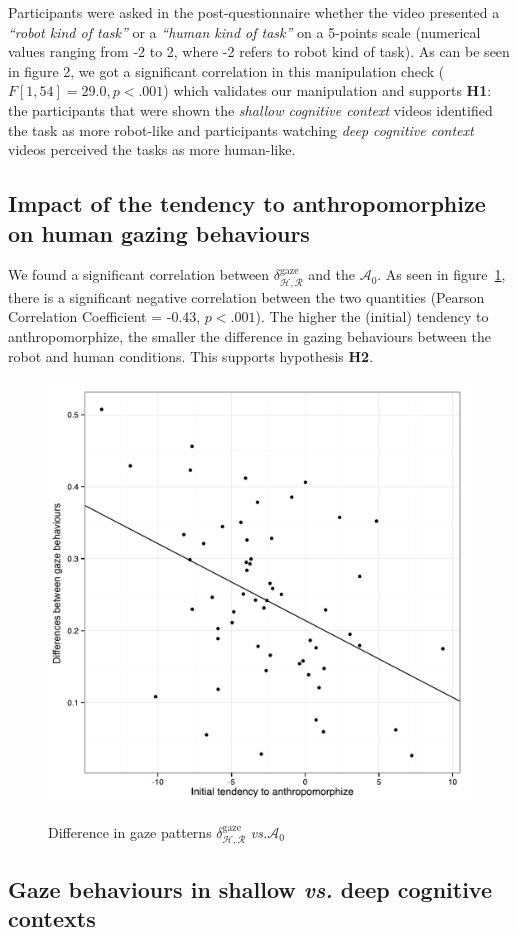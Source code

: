 \documentclass[lettersize, noapacite, twoside, HRI]{apa_HRI}
\newcommand{\vs}{\textit{vs.}\xspace}
\newcommand{\h}[1]{\textbf{H#1}\xspace}
\newcommand{\anti}{{$\mathcal{A}_0$\xspace}}
\begin{document}
Participants were asked in the post-questionnaire whether the video presented a
\emph{``robot kind of task''} or a \emph{``human kind of task''} on a 5-points
scale (numerical values ranging from -2 to 2, where -2 refers to robot kind of
task). As can be seen in figure 2, we got a significant correlation in this
manipulation check ($F[1,54] = 29.0, p < .001$) which validates our manipulation
and supports \h{1}: the participants that were shown the \emph{shallow cognitive
context} videos identified the task as more robot-like and participants watching
\emph{deep cognitive context} videos perceived the tasks as more human-like. 


\subsection{Impact of the tendency to anthropomorphize on human
gazing behaviours}

We found a significant correlation between
$\delta_{\mathcal{H},\mathcal{R}}^{\text{gaze}}$ and
the \anti. As seen in figure~\ref{h2}, there is a significant negative
correlation between the two quantities (Pearson Correlation Coefficient = -0.43,
$p < .001$). The higher the (initial) tendency to anthropomorphize, the smaller
the difference in gazing behaviours between the robot and human conditions. This
supports hypothesis \h{2}.

\begin{figure}
    \centering
    \includegraphics[width=0.5\columnwidth]{H2}\label{GazeDifference-vs-ICA}
    \caption{Difference in gaze patterns $\delta_{\mathcal{H},
    \mathcal{R}}^{\text{gaze}}$ \vs \anti}
    \label{h2}
\end{figure}

\subsection{Gaze behaviours in shallow \vs deep cognitive contexts}
\end{document}
